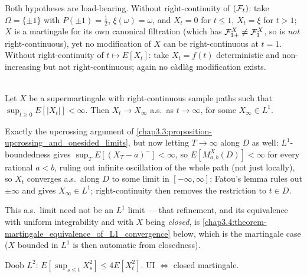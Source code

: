 \begin{trap}
Both hypotheses are load-bearing. Without right-continuity of $(\mathcal{F}_t)$: take $\Omega=\{\pm1\}$ with $P(\pm1)=\tfrac12$, $\xi(\omega)=\omega$, and $X_t=0$ for $t\le1$, $X_t=\xi$ for $t>1$; $X$ is a martingale for its own canonical filtration (which has $\mathcal{F}_{1+}^X\ne\mathcal{F}_1^X$, so is \emph{not} right-continuous), yet no modification of $X$ can be right-continuous at $t=1$. Without right-continuity of $t\mapsto E[X_t]$: take $X_t=f(t)$ deterministic and non-increasing but not right-continuous; again no càdlàg modification exists.
\end{trap}

\begin{theorem} \label{chap3.3:theorem-as_convergence_L1_bounded}  \\
Let $X$ be a supermartingale with right-continuous sample paths such that $\sup_{t\ge0}E[|X_t|]<\infty$. Then $X_t\to X_\infty$ a.s.\ as $t\to\infty$, for some $X_\infty\in L^1$.
\end{theorem}
\begin{proofidea}
Exactly the upcrossing argument of \cref{chap3.3:proposition-upcrossing_and_onesided_limits}, but now letting $T\to\infty$ along $D$ as well: $L^1$-boundedness gives $\sup_TE[(X_T-a)^-]<\infty$, so $E[M_{a,b}^X(D)]<\infty$ for every rational $a<b$, ruling out infinite oscillation of the whole path (not just locally), so $X_t$ converges a.s.\ along $D$ to some limit in $[-\infty,\infty]$; Fatou's lemma rules out $\pm\infty$ and gives $X_\infty\in L^1$; right-continuity then removes the restriction to $t\in D$.
\end{proofidea}
\begin{remark}
This a.s.\ limit need not be an $L^1$ limit --- that refinement, and its equivalence with uniform integrability and with $X$ being \textit{closed}, is \cref{chap3.4:theorem-martingale_equivalence_of_L1_convergence} below, which is the martingale case ($X$ bounded in $L^1$ is then automatic from closedness).
\end{remark}
\begin{quizbox} Doob $L^2$: $E[\sup_{s\le t}X_s^2]\le4E[X_t^2]$. UI $\iff$ closed martingale. \end{quizbox}

